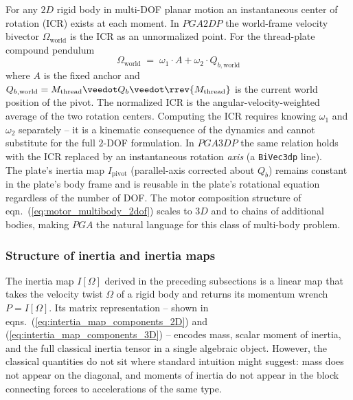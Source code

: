 For any $2D$ rigid body in multi-DOF planar motion an instantaneous center of rotation
(ICR) exists at each moment. In $PGA2DP$ the world-frame velocity bivector
$\Omega_\text{world}$ is the ICR as an unnormalized point. For the thread-plate compound
pendulum
\begin{equation}
    \Omega_\text{world} \;=\; \omega_1 \cdot A + \omega_2 \cdot Q_{b,\text{world}}
    \label{eq:icr_2dof}
\end{equation}
where $A$ is the fixed anchor and $Q_{b,\text{world}} = M_\text{thread} \veedot Q_b
\veedot \rrev{M_\text{thread}}$ is the current world position of the pivot. The
normalized ICR is the angular-velocity-weighted average of the two rotation centers.
Computing the ICR requires knowing $\omega_1$ and $\omega_2$ separately -- it is a
kinematic consequence of the dynamics and cannot substitute for the full $2$-DOF
formulation. In $PGA3DP$ the same relation holds with the ICR replaced by an
instantaneous rotation \emph{axis} (a \texttt{BiVec3dp} line). \\

The plate's inertia map $I_\text{pivot}$ (parallel-axis corrected about $Q_b$) remains
constant in the plate's body frame and is reusable in the plate's rotational equation
regardless of the number of DOF. The motor composition structure of
eqn.~(\ref{eq:motor_multibody_2dof}) scales to $3D$ and to chains of additional bodies,
making $PGA$ the natural language for this class of multi-body problem. \\


\subsubsection{Structure of inertia and inertia maps}
\label{subsubsection_structure_inertia_maps}

The inertia map $I[\Omega]$ derived in the preceding subsections is a linear map that
takes the velocity twist $\Omega$ of a rigid body and returns its momentum wrench $P =
I[\Omega]$. Its matrix representation -- shown in
eqns.~(\ref{eq:intertia_map_components_2D}) and (\ref{eq:intertia_map_components_3D}) --
encodes mass, scalar moment of inertia, and the full classical inertia tensor in a single
algebraic object. However, the classical quantities do not sit where standard intuition
might suggest: mass does not appear on the diagonal, and moments of inertia do not appear
in the block connecting forces to accelerations of the same type. \\

